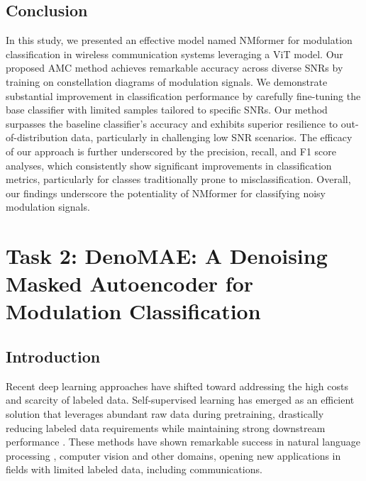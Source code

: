 \subsection{Conclusion}

In this study, we presented an effective model named NMformer for modulation classification in wireless communication systems leveraging a ViT model. Our proposed AMC method achieves remarkable accuracy across diverse SNRs by training on constellation diagrams of modulation signals. We demonstrate substantial improvement in classification performance by carefully fine-tuning the base classifier with limited samples tailored to specific SNRs. Our method surpasses the baseline classifier's accuracy and exhibits superior resilience to out-of-distribution data, particularly in challenging low SNR scenarios. The efficacy of our approach is further underscored by the precision, recall, and F1 score analyses, which consistently show significant improvements in classification metrics, particularly for classes traditionally prone to misclassification. Overall, our findings underscore the potentiality of NMformer for classifying noisy modulation signals.

\section{Task 2: DenoMAE: A Denoising Masked Autoencoder for Modulation Classification}

\subsection{Introduction}

Recent deep learning approaches have shifted toward addressing the high costs and scarcity of labeled data. Self-supervised learning has emerged as an efficient solution that leverages abundant raw data during pretraining, drastically reducing labeled data requirements while maintaining strong downstream performance \cite{balestriero2023cookbookselfsupervisedlearning}. These methods have shown remarkable success in natural language processing \cite{roberts2019exploring}, computer vision \cite{caron2021emerging} and other domains, opening new applications in fields with limited labeled data, including communications.

